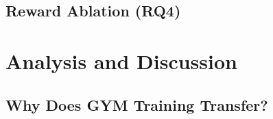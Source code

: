 \documentclass{article}
\begin{document}

\subsection{Reward Ablation (RQ4)}

\begin{table}[t]
\centering
\caption{Reward ablation on Lingshu-7B. Each row adds one reward dimension. Acc = accuracy, Proc = process, Safe = safety, Fmt = format, Coh = coherence. Safety metric: refusal rate on 50 adversarial prompts (higher = safer).}
\label{tab:reward_ablation}
\end{table}



\section{Analysis and Discussion}
\label{sec:analysis}

\subsection{Why Does GYM Training Transfer?}
\end{document}
